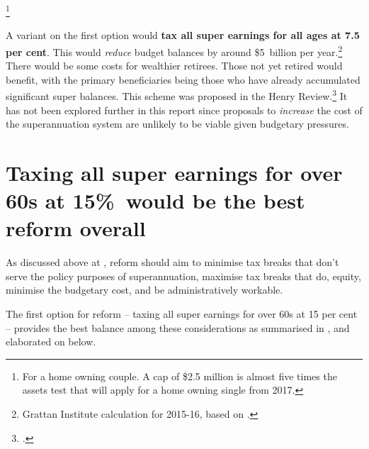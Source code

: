 \begin{enumerate}
\footnote{For a home owning couple. A cap of \$2.5 million is almost five times the assets test that will apply for a home owning single from 2017.}  
\end{enumerate}

A variant on the first option would \textbf{tax all super earnings for all ages at 7.5 per cent}. This would \emph{reduce} budget balances by around \$5~billion per year.\footnote{Grattan Institute calculation for 2015-16, based on \textcite{Treasury2010SuperAdditionalMaterial}.}  There would be some costs for wealthier retirees. Those not yet retired would benefit, with the primary beneficiaries being those who have already accumulated significant super balances. This scheme was proposed in the Henry Review.\footcite[][36]{HenryTaxReview2010}  It has not been explored further in this report since proposals to \emph{increase} the cost of the superannuation system are unlikely to be viable given budgetary pressures.

\section{Taxing all super earnings for over 60s at 15\%\ would be the best reform overall}\label{sec:SUPER-6-4}
As discussed above at , reform should aim to minimise tax breaks that don’t serve the policy purposes of superannuation, maximise tax breaks that do, equity, minimise the budgetary cost, and be administratively workable.

The first option for reform – taxing all super earnings for over 60s at 15 per cent – provides the best balance among these considerations as summarised in , and elaborated on below.

